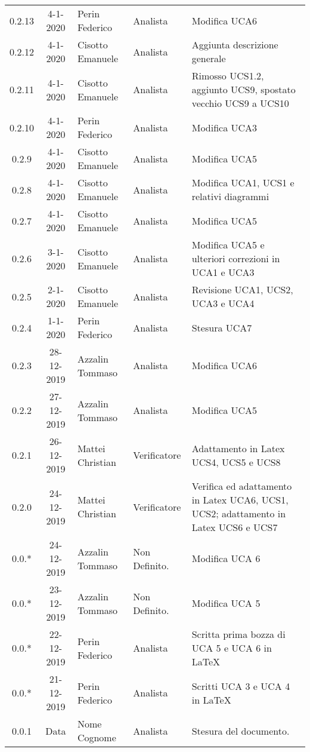 {\begin{longtable}{ c c  C{4cm}  C{3cm} C{4cm}}
0.2.13 & 4-1-2020 & Perin Federico & Analista & Modifica UCA6 \\

0.2.12 & 4-1-2020 & Cisotto Emanuele & Analista & Aggiunta descrizione generale \\

0.2.11 & 4-1-2020 & Cisotto Emanuele & Analista & Rimosso UCS1.2, aggiunto UCS9, spostato vecchio UCS9 a UCS10 \\

0.2.10 & 4-1-2020 & Perin Federico & Analista & Modifica UCA3 \\

0.2.9 & 4-1-2020 & Cisotto Emanuele & Analista & Modifica UCA5 \\

0.2.8 & 4-1-2020 & Cisotto Emanuele & Analista & Modifica UCA1, UCS1 e relativi diagrammi \\

0.2.7 & 4-1-2020 & Cisotto Emanuele & Analista & Modifica UCA5 \\

0.2.6 & 3-1-2020 & Cisotto Emanuele & Analista & Modifica UCA5 e ulteriori correzioni in UCA1 e UCA3 \\

0.2.5 & 2-1-2020 & Cisotto Emanuele & Analista & Revisione UCA1, UCS2, UCA3 e UCA4 \\

0.2.4 & 1-1-2020 & Perin Federico & Analista & Stesura UCA7 \\

0.2.3 & 28-12-2019 & Azzalin Tommaso & Analista & Modifica UCA6 \\

0.2.2 & 27-12-2019 & Azzalin Tommaso & Analista & Modifica UCA5 \\

0.2.1 & 26-12-2019 & Mattei Christian & Verificatore & Adattamento in Latex UCS4, UCS5 e UCS8 \\

0.2.0 & 24-12-2019 & Mattei Christian & Verificatore & Verifica ed adattamento in Latex UCA6, UCS1, UCS2; adattamento in Latex UCS6 e UCS7 \\

0.0.* & 24-12-2019 & Azzalin Tommaso & Non Definito. & Modifica UCA 6\\

0.0.* & 23-12-2019 & Azzalin Tommaso & Non Definito. & Modifica UCA 5\\

0.0.* & 22-12-2019 & Perin Federico & Analista & Scritta prima bozza di UCA 5 e UCA 6 in LaTeX\\

0.0.* & 21-12-2019 & Perin Federico & Analista & Scritti UCA 3 e UCA 4 in LaTeX\\

0.0.1 & Data & Nome Cognome & Analista & Stesura del documento.  \\		
		
\end{longtable}
}